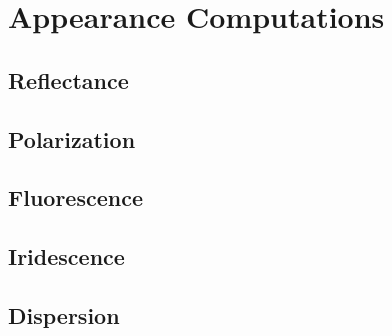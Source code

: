 \chapter{Appearance Computations}
\label{chap:appearance}

\section{Reflectance}

\section{Polarization}

\section{Fluorescence}

\section{Iridescence}

\section{Dispersion}